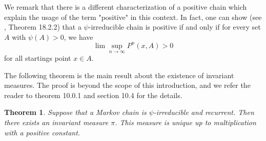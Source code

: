 \documentclass[a4paper, draft]{article}
\theoremstyle{own}
\newtheorem{thm}{Theorem}[section]
\theoremstyle{remark}
\begin{document}
We remark that there is a different characterization of a positive chain which explain the usage of the term "positive" in this context. In fact, one can show (see \cite{MeynTweedie}, Theorem 18.2.2) that a $\psi$-irreducible chain is positive if and only if for every set $A$ with $\psi(A) > 0$, we have
$$
\lim \sup_{n \rightarrow \infty} P^n(x,A) > 0
$$
for all startings point $x \in A$. 

The following theorem is the main result about the existence of invariant measures. The proof is beyond the scope of this introduction, and we refer the reader to \cite{MeynTweedie} theorem 10.0.1 and section 10.4 for the details.

\begin{thm}
	Suppose that a Markov chain is $\psi$-irreducible and recurrent. Then there exists an invariant measure $\pi$. This measure is unique up to multiplication with a positive constant.
\end{thm}
\end{document}
